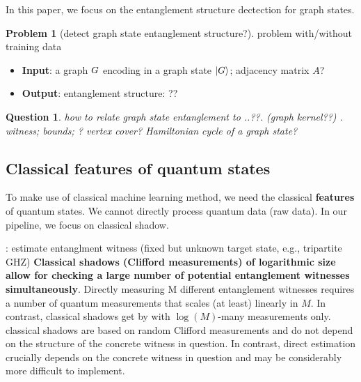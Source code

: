 \documentclass[
aps,
pra,
floatfix,
]{revtex4-2}
\theoremstyle{plain}
\newtheorem{question}{Question}
\theoremstyle{definition}
\newtheorem{problem}{Problem}
\begin{document}
In this paper, we focus on the entanglement structure dectection for graph states.
\begin{problem}[detect graph state entanglement structure?]
	problem with/without training data
	\begin{itemize}
		\item \textbf{Input}: a graph $G$ encoding in a graph state $\ket{G}$;
		adjacency matrix $A$?
		\item \textbf{Output}: entanglement structure: \textsf{}??
	\end{itemize}
\end{problem}
\begin{question}
	how to relate graph state entanglement to 
	..??. (graph kernel??)
	\cite{heinEntanglementGraphStates2006}.
	witness; bounds; ? vertex cover?
	Hamiltonian cycle of a graph state? 
\end{question} 


\subsection{Classical features of quantum states}
To make use of classical machine learning method, we need the classical \textbf{features} of quantum states.
We cannot directly process quantum data (raw data).
In our pipeline, we focus on classical shadow.

 \cite{huangPredictingManyProperties2020}: estimate entanglment witness (fixed but unknown target state, e.g., tripartite GHZ)
\textbf{Classical shadows (Clifford measurements) of logarithmic size allow for checking a large number of potential entanglement witnesses simultaneously}.
Directly measuring M diﬀerent entanglement witnesses requires a number of quantum measurements that scales (at least) linearly in $M$. In contrast, classical shadows get by with $\log(M)$-many measurements only.
classical shadows are based on random Clifford measurements and do not depend on the structure of the concrete witness in question. In contrast, direct estimation crucially depends on the concrete witness in question and may be considerably more diﬃcult to implement.
\end{document}
